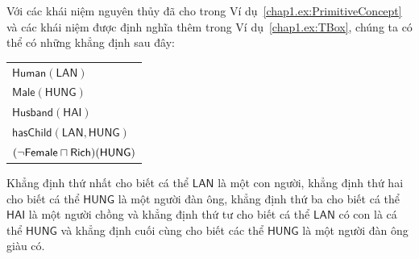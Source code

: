 \begin{Example}\label{chap1.ex:ABox}
  Với các khái niệm nguyên thủy đã cho trong Ví dụ~\ref{chap1.ex:PrimitiveConcept} và các khái niệm được định nghĩa thêm trong Ví dụ~\ref{chap1.ex:TBox}, chúng ta có thể có những khẳng định sau đây:

  \begin{tabular}{l}
    $\mathsf{Human(LAN)}$\\
    $\mathsf{Male(HUNG)}$\\
    $\mathsf{Husband(HAI)}$\\
    $\mathsf{hasChild(LAN, HUNG)}$\\
    $\mathsf{(\neg Female \sqcap Rich)(HUNG)}$
  \end{tabular}

Khẳng định thứ nhất cho biết cá thể $\mathsf{LAN}$ là một con người, khẳng định thứ hai cho biết cá thể $\mathsf{HUNG}$ là một người đàn ông, khẳng định thứ ba cho biết cá thể $\mathsf{HAI}$ là một người chồng và khẳng định thứ tư cho biết cá thể $\mathsf{LAN}$ có con là cá thể $\mathsf{HUNG}$ và khẳng định cuối cùng cho biết các thể $\mathsf{HUNG}$ là một người đàn ông giàu có.\myend
\end{Example}

